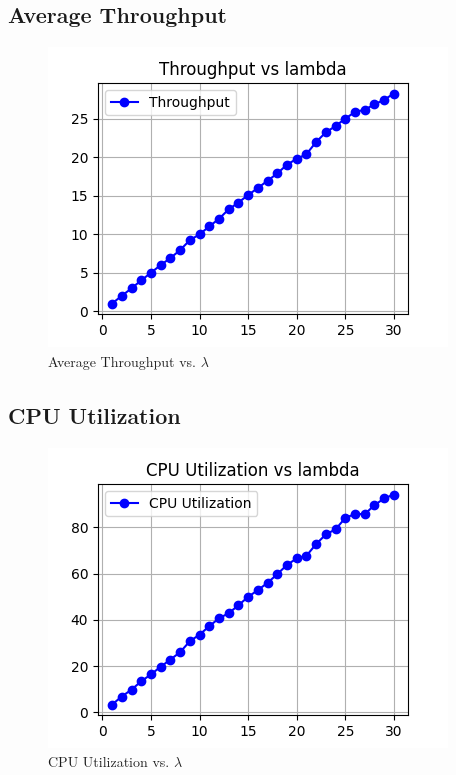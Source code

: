 \documentclass[12pt]{article}
\begin{document}
\subsection{Average Throughput}
\begin{figure}[H]
\centering
\centerline{\includegraphics{figs/Throughput_vs_lambda.png}}
\caption{Average Throughput vs. $\lambda$}
\end{figure}

\subsection{CPU Utilization}
\begin{figure}[H]
\centering
\centerline{\includegraphics{figs/CPU Utilization_vs_lambda.png}}
\caption{CPU Utilization vs. $\lambda$}
\end{figure}
\end{document}

